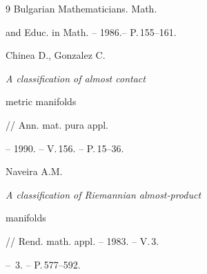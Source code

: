 \begin{thebibliography}{9}
Bulgarian Mathematicians. Math. 


and Educ. in Math. -- 1986.-- P.\,155--161. 




Chinea D., Gonzalez C. {\em A classification of almost contact 


metric manifolds} // Ann. mat. pura appl. 


-- 1990. -- V.\,156. -- P.\,15--36. 




Naveira A.M. {\em A classification of Riemannian almost-product 


manifolds} // Rend. math. appl. -- 1983. -- V.\,3. 


-- \No\,3. -- P.\,577--592. 


 


\end{thebibliography} 


 


\vskip 1cm 


 






 


\label{end} 


 


